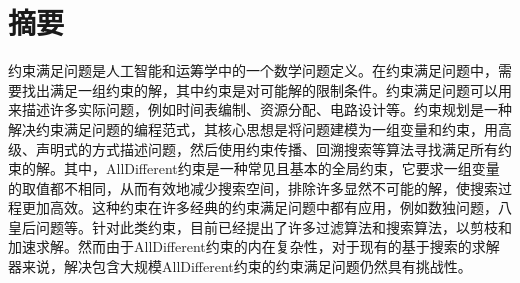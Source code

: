 \maketitle%
\MAKETITLE%
\makedeclaration%
\intobmk\chapter*{摘\quad 要}%
\setcounter{page}{1}%


约束满足问题是人工智能和运筹学中的一个数学问题定义。在约束满足问题中，需要找出满足一组约束的解，其中约束是对可能解的限制条件。约束满足问题可以用来描述许多实际问题，例如时间表编制、资源分配、电路设计等。约束规划是一种解决约束满足问题的编程范式，其核心思想是将问题建模为一组变量和约束，用高级、声明式的方式描述问题，然后使用约束传播、回溯搜索等算法寻找满足所有约束的解。其中，AllDifferent约束是一种常见且基本的全局约束，它要求一组变量的取值都不相同，从而有效地减少搜索空间，排除许多显然不可能的解，使搜索过程更加高效。这种约束在许多经典的约束满足问题中都有应用，例如数独问题，八皇后问题等。针对此类约束，目前已经提出了许多过滤算法和搜索算法，以剪枝和加速求解。然而由于AllDifferent约束的内在复杂性，对于现有的基于搜索的求解器来说，解决包含大规模AllDifferent约束的约束满足问题仍然具有挑战性。

